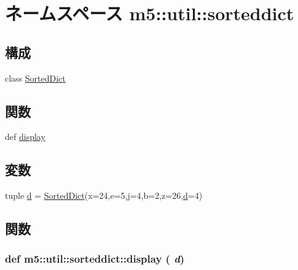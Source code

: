 \hypertarget{namespacem5_1_1util_1_1sorteddict}{
\section{ネームスペース m5::util::sorteddict}
\label{namespacem5_1_1util_1_1sorteddict}
}
\subsection*{構成}
\begin{DoxyCompactItemize}
\item 
class \hyperlink{classm5_1_1util_1_1sorteddict_1_1SortedDict}{SortedDict}
\end{DoxyCompactItemize}
\subsection*{関数}
\begin{DoxyCompactItemize}
\item 
def \hyperlink{namespacem5_1_1util_1_1sorteddict_a4378e52e5984e9deabed46bfd46fa721}{display}
\end{DoxyCompactItemize}
\subsection*{変数}
\begin{DoxyCompactItemize}
\item 
tuple \hyperlink{namespacem5_1_1util_1_1sorteddict_a59c1414ead6bfdabaeae7361ef56d1eb}{d} = \hyperlink{classm5_1_1util_1_1sorteddict_1_1SortedDict}{SortedDict}(x=24,e=5,j=4,b=2,z=26,\hyperlink{namespacem5_1_1util_1_1sorteddict_a59c1414ead6bfdabaeae7361ef56d1eb}{d}=4)
\end{DoxyCompactItemize}


\subsection{関数}
\hypertarget{namespacem5_1_1util_1_1sorteddict_a4378e52e5984e9deabed46bfd46fa721}{
\subsubsection[{display}]{\setlength{\rightskip}{0pt plus 5cm}def m5::util::sorteddict::display ( {\em d})}}
\label{namespacem5_1_1util_1_1sorteddict_a4378e52e5984e9deabed46bfd46fa721}



